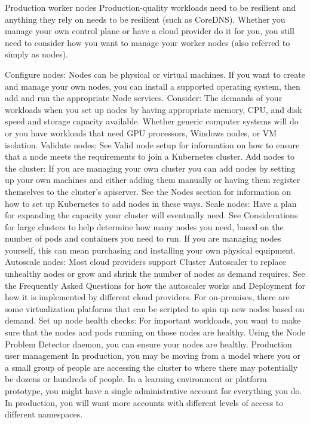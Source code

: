 Production worker nodes
Production-quality workloads need to be resilient and anything they rely on needs to be resilient (such as CoreDNS). Whether you manage your own control plane or have a cloud provider do it for you, you still need to consider how you want to manage your worker nodes (also referred to simply as nodes).

Configure nodes: Nodes can be physical or virtual machines. If you want to create and manage your own nodes, you can install a supported operating system, then add and run the appropriate Node services. Consider:
The demands of your workloads when you set up nodes by having appropriate memory, CPU, and disk speed and storage capacity available.
Whether generic computer systems will do or you have workloads that need GPU processors, Windows nodes, or VM isolation.
Validate nodes: See Valid node setup for information on how to ensure that a node meets the requirements to join a Kubernetes cluster.
Add nodes to the cluster: If you are managing your own cluster you can add nodes by setting up your own machines and either adding them manually or having them register themselves to the cluster’s apiserver. See the Nodes section for information on how to set up Kubernetes to add nodes in these ways.
Scale nodes: Have a plan for expanding the capacity your cluster will eventually need. See Considerations for large clusters to help determine how many nodes you need, based on the number of pods and containers you need to run. If you are managing nodes yourself, this can mean purchasing and installing your own physical equipment.
Autoscale nodes: Most cloud providers support Cluster Autoscaler to replace unhealthy nodes or grow and shrink the number of nodes as demand requires. See the Frequently Asked Questions for how the autoscaler works and Deployment for how it is implemented by different cloud providers. For on-premises, there are some virtualization platforms that can be scripted to spin up new nodes based on demand.
Set up node health checks: For important workloads, you want to make sure that the nodes and pods running on those nodes are healthy. Using the Node Problem Detector daemon, you can ensure your nodes are healthy.
Production user management
In production, you may be moving from a model where you or a small group of people are accessing the cluster to where there may potentially be dozens or hundreds of people. In a learning environment or platform prototype, you might have a single administrative account for everything you do. In production, you will want more accounts with different levels of access to different namespaces.

